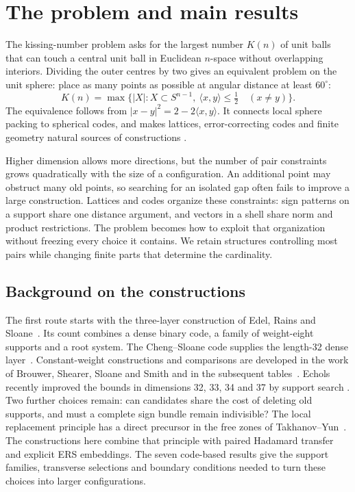 \section{The problem and main results}

The kissing-number problem asks for the largest number $K(n)$ of unit
balls that can touch a central unit ball in Euclidean $n$-space without
overlapping interiors. Dividing the outer centres by two gives an equivalent
problem on the unit sphere: place as many points as possible at angular
distance at least $60^\circ$:
\[
K(n)=\max\{|X|:X\subset S^{n-1},\
\langle x,y\rangle\le\tfrac12\quad(x\ne y)\}.
\]
The equivalence follows from $|x-y|^2=2-2\langle x,y\rangle$. It connects
local sphere packing to spherical codes, and makes lattices, error-correcting
codes and finite geometry natural sources of constructions
\cite{conway1999sphere,dgs,leech-sloane1971}.

Higher dimension allows more directions, but the number of pair constraints
grows quadratically with the size of a configuration. An additional point
may obstruct many old points, so searching for an isolated gap often fails
to improve a large construction. Lattices and codes organize these
constraints: sign patterns on a support share one distance argument, and
vectors in a shell share norm and product restrictions. The problem becomes
how to exploit that organization without freezing every choice it contains.
We retain structures controlling most pairs while changing finite parts
that determine the cardinality.



\subsection{Background on the constructions}

The first route starts with the three-layer construction of Edel, Rains
and Sloane~\cite{ers}. Its count combines a dense binary code, a family of
weight-eight supports and a root system. The Cheng--Sloane code supplies
the length-32 dense layer~\cite{chengsloane}. Constant-weight constructions
and comparisons are developed in the work of Brouwer, Shearer, Sloane and
Smith and in the subsequent tables~\cite{bsss,brouwer}. Echols recently
improved the bounds in dimensions 32, 33, 34 and 37 by support search
\cite{echols}. Two further choices remain: can candidates share the cost
of deleting old supports, and must a complete sign bundle remain
indivisible? The local replacement principle has a direct precursor in
the free zones of Takhanov--Yun~\cite[Section V]{signed-johnson}.
The constructions here combine that principle with paired Hadamard
transfer and explicit ERS embeddings. The seven code-based results
give the support families, transverse selections and boundary conditions
needed to turn these choices into larger configurations.

